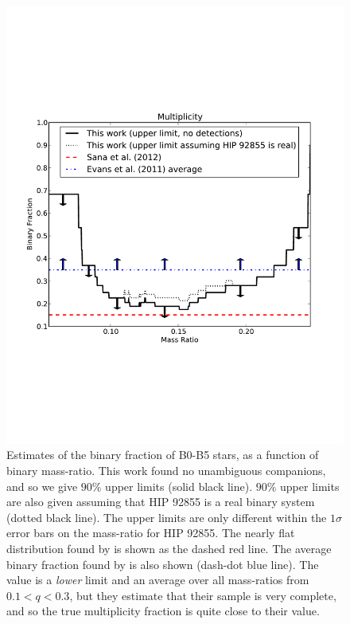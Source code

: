 \begin{figure}[ht]
  \centering
  \includegraphics[width=\columnwidth]{Figures/paper1_fig7.pdf}
  \caption{Estimates of the binary fraction of B0-B5 stars,
    as a function of binary mass-ratio. This work found no unambiguous companions,
    and so we give $90\%$ upper limits (solid black line). $90\%$
    upper limits are also given assuming that HIP 92855 is a real
    binary system (dotted black line). The upper limits are only different within the
    $1\sigma$ error bars on the mass-ratio for HIP 92855. The nearly flat 
    distribution found by \cite{Sana2012} is shown as the dashed red line. The average binary 
    fraction found by \cite{Evans2011} is also shown (dash-dot blue line). The
    \cite{Evans2011} value is a \emph{lower} limit and an average over all mass-ratios from $0.1 < q < 0.3$, but they estimate
    that their sample is very complete, and so the true multiplicity fraction is quite close to their value.}
  \label{paper1_fig:limits}
\end{figure}



